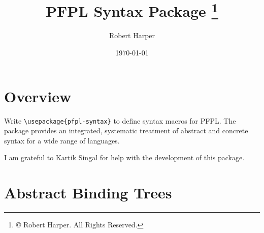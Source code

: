 \documentclass[11pt]{article}
\title{\textsf{PFPL} Syntax Package%
\footnote{\copyright{} \the\year{} Robert Harper.  All Rights Reserved.}}
\author{Robert Harper}
\date{\today}
\begin{document}
\maketitle{}

\section*{Overview}

Write \verb|\usepackage{pfpl-syntax}| to define syntax macros for \textsf{PFPL}.  The package provides an integrated, systematic treatment of abstract and concrete syntax for a wide range of languages.

I am grateful to Kartik Singal for help with the development of this package.

\section*{Abstract Binding Trees}
\end{document}
